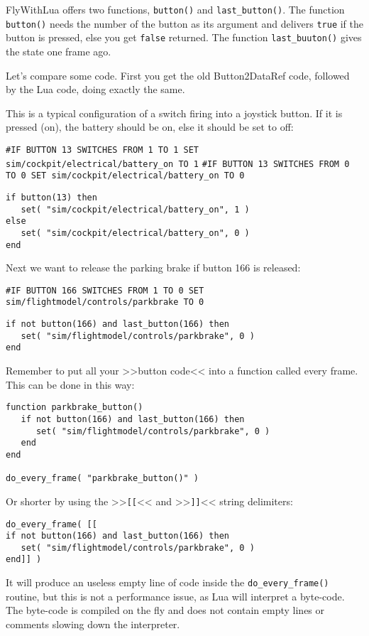 \documentclass[11pt,parskip=half,a4paper]{scrartcl}
\begin{document}
FlyWithLua offers two functions, \verb|button()| and \verb|last_button()|. The function \verb|button()| needs the number of the button as its argument and delivers \verb|true| if the button is pressed, else you get \verb|false| returned. The function \verb|last_buuton()| gives the state one frame ago.

Let's compare some code. First you get the old Button2DataRef code, followed by the Lua code, doing exactly the same.

This is a typical configuration of a switch firing into a joystick button. If it is pressed (on), the battery should be on, else it should be set to off:

\verb|#IF BUTTON 13 SWITCHES FROM 1 TO 1 SET sim/cockpit/electrical/battery_on TO 1|
\verb|#IF BUTTON 13 SWITCHES FROM 0 TO 0 SET sim/cockpit/electrical/battery_on TO 0|
\begin{lstlisting}
if button(13) then
   set( "sim/cockpit/electrical/battery_on", 1 )
else
   set( "sim/cockpit/electrical/battery_on", 0 )
end
\end{lstlisting}

Next we want to release the parking brake if button 166 is released:

\verb|#IF BUTTON 166 SWITCHES FROM 1 TO 0 SET sim/flightmodel/controls/parkbrake TO 0|
\begin{lstlisting}
if not button(166) and last_button(166) then
   set( "sim/flightmodel/controls/parkbrake", 0 )
end
\end{lstlisting}

Remember to put all your >>button code<< into a function called every frame. This can be done in this way:

\begin{lstlisting}
function parkbrake_button()
   if not button(166) and last_button(166) then
      set( "sim/flightmodel/controls/parkbrake", 0 )
   end
end

do_every_frame( "parkbrake_button()" )
\end{lstlisting}

Or shorter by using the >>\verb|[[|<< and >>\verb|]]|<< string delimiters:

\begin{lstlisting}
do_every_frame( [[
if not button(166) and last_button(166) then
   set( "sim/flightmodel/controls/parkbrake", 0 )
end]] )
\end{lstlisting}

It will produce an useless empty line of code inside the \verb|do_every_frame()| routine, but this is not a performance issue, as Lua will interpret a byte-code. The byte-code is compiled on the fly and does not contain empty lines or comments slowing down the interpreter.
\end{document}
